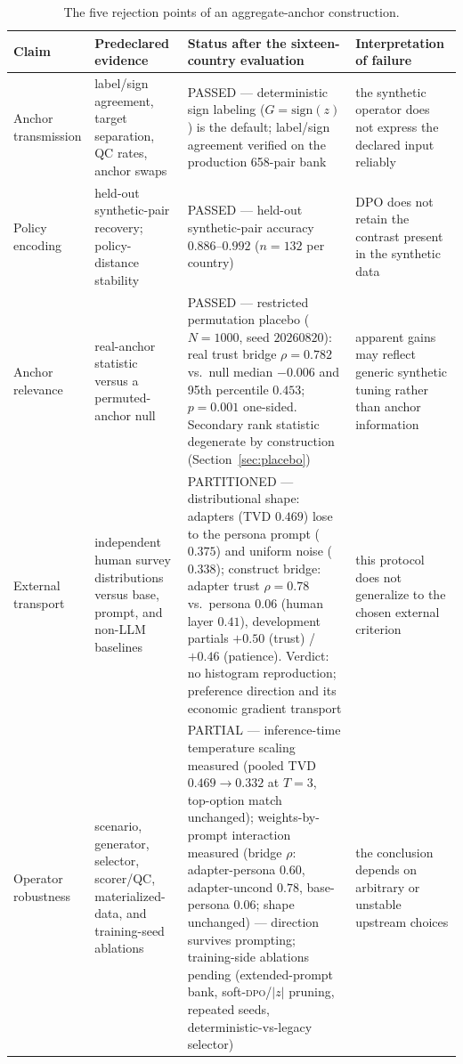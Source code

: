 \documentclass[10pt,letterpaper]{article}
\newcommand{\DPO}{\textsc{dpo}}
\begin{document}
\begin{table}[H]
\centering\small
\caption{The five rejection points of an aggregate-anchor construction.}\label{tab:tests}
\begin{tabularx}{\textwidth}{@{}p{1.85cm}p{2.15cm}p{8.55cm}X@{}}
\toprule
\textbf{Claim} & \textbf{Predeclared evidence} & \textbf{Status after the sixteen-country evaluation} & \textbf{Interpretation of failure}\\
\midrule
Anchor transmission & label/sign agreement, target separation, QC rates, anchor swaps & PASSED --- deterministic sign labeling ($G=\mathrm{sign}(z)$) is the default; label/sign agreement verified on the production 658-pair bank & the synthetic operator does not express the declared input reliably\\
Policy encoding & held-out synthetic-pair recovery; policy-distance stability & PASSED --- held-out synthetic-pair accuracy $0.886$--$0.992$ ($n=132$ per country) & DPO does not retain the contrast present in the synthetic data\\
Anchor relevance & real-anchor statistic versus a permuted-anchor null & PASSED --- restricted permutation placebo ($N{=}1000$, seed $20260820$): real trust bridge $\rho=0.782$ vs.\ null median $-0.006$ and 95th percentile $0.453$; $p=0.001$ one-sided. Secondary rank statistic degenerate by construction (Section~\ref{sec:placebo}) & apparent gains may reflect generic synthetic tuning rather than anchor information\\
External transport & independent human survey distributions versus base, prompt, and non-LLM baselines & PARTITIONED --- distributional shape: adapters (TVD $0.469$) lose to the persona prompt ($0.375$) and uniform noise ($0.338$); construct bridge: adapter trust $\rho=0.78$ vs.\ persona $0.06$ (human layer $0.41$), development partials $+0.50$ (trust) / $+0.46$ (patience). Verdict: no histogram reproduction; preference direction and its economic gradient transport & this protocol does not generalize to the chosen external criterion\\
Operator robustness & scenario, generator, selector, scorer/QC, materialized-data, and training-seed ablations & PARTIAL --- inference-time temperature scaling measured (pooled TVD $0.469\to0.332$ at $T=3$, top-option match unchanged); weights-by-prompt interaction measured (bridge $\rho$: adapter-persona $0.60$, adapter-uncond $0.78$, base-persona $0.06$; shape unchanged) --- direction survives prompting; training-side ablations pending (extended-prompt bank, soft-\DPO{}/$|z|$ pruning, repeated seeds, deterministic-vs-legacy selector) & the conclusion depends on arbitrary or unstable upstream choices\\
\bottomrule
\end{tabularx}
\end{table}
\end{document}

